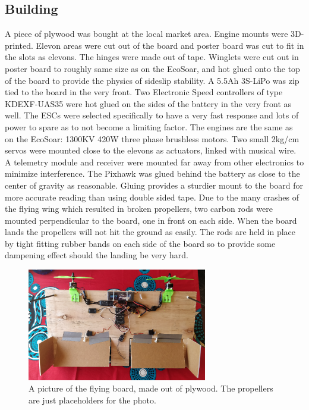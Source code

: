 \documentclass{article}
\begin{document}
\subsection{Building}
A piece of plywood was bought at the local market area.
Engine mounts were 3D-printed.
Elevon areas were cut out of the board and poster board was cut to fit in the slots as elevons.
The hinges were made out of tape.
Winglets were cut out in poster board to roughly same size as on the EcoSoar, and hot glued onto the top of the board to provide the physics of sideslip stability.
A 5.5Ah 3S-LiPo was zip tied to the board in the very front.
Two Electronic Speed controllers of type KDEXF-UAS35 were hot glued on the sides of the battery in the very front as well.
The ESCs were selected specifically to have a very fast response and lots of power to spare as to not become a limiting factor.
The engines are the same as on the EcoSoar: 1300KV 420W three phase brushless motors.
Two small 2kg/cm servos were mounted close to the elevons as actuators, linked with musical wire.
A telemetry module and receiver were mounted far away from other electronics to minimize interference.
The Pixhawk was glued behind the battery as close to the center of gravity as reasonable.
Gluing provides a sturdier mount to the board for more accurate reading than using double sided tape.
Due to the many crashes of the flying wing which resulted in broken propellers, two carbon rods were mounted perpendicular to the board, one in front on each side.
When the board lands the propellers will not hit the ground as easily.
The rods are held in place by tight fitting rubber bands on each side of the board so to provide some dampening effect should the landing be very hard.

\begin{figure}
    \center
    \includegraphics[width=0.7\textwidth]{FlyingBoard.jpg}
    \caption{A picture of the flying board, made out of plywood. The propellers are just placeholders for the photo.}
\end{figure}
\end{document}
